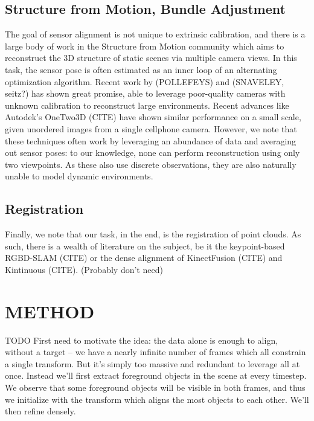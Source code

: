 \documentclass[letterpaper, 10 pt, conference]{ieeeconf}  %
\begin{document}
\subsection{Structure from Motion, Bundle Adjustment}

The goal of sensor alignment is not unique to extrinsic calibration, and there is a large body of work in the 
Structure from Motion community which aims to reconstruct the 3D structure of static scenes via multiple camera 
views. In this task, the sensor pose is often estimated as an inner loop of an alternating optimization algorithm. 
Recent work by (POLLEFEYS) and (SNAVELEY, seitz?) has shown great promise, able to leverage poor-quality cameras with 
unknown calibration to reconstruct large environments. Recent advances like Autodek's OneTwo3D (CITE) have shown 
similar performance on a small scale, given unordered images from a single cellphone camera. However, we note 
that these techniques often work by leveraging an abundance of data and averaging out sensor poses: to our knowledge, 
none can perform reconstruction using only two viewpoints. As these also use discrete observations, they are also 
naturally unable to model dynamic environments.

\subsection{Registration}
Finally, we note that our task, in the end, is the registration of point clouds. As such, there is a wealth of 
literature on the subject, be it the keypoint-based RGBD-SLAM (CITE) or the dense alignment of KinectFusion (CITE) 
and Kintinuous (CITE). (Probably don't need)






\section{METHOD}

TODO First need to motivate the idea: the data alone is enough to align, without a target -- we have a nearly infinite number of frames which all constrain a single transform. But it's simply too massive 
and redundant to leverage all at once. Instead we'll first extract foreground objects in the scene at every timestep. 
We observe that some foreground objects will be visible in both frames, and thus we initialize with the transform which aligns the most objects to each other. We'll then refine densely.
\end{document}
